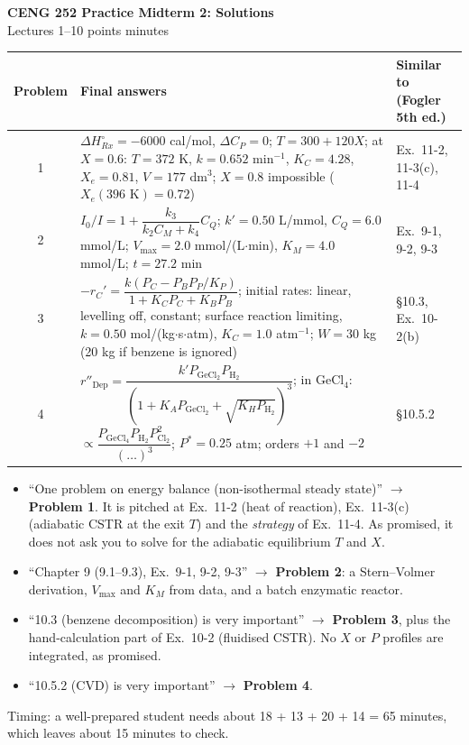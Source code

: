 \documentclass[11pt]{article}
\begin{document}
\begin{center}
{\LARGE\bfseries CENG 252 Practice Midterm 2: Solutions}\\[4pt]
Lectures 1--10 \quad\textbullet{} points \quad\textbullet{} minutes
\end{center}

\begin{center}
\small
\renewcommand{\arraystretch}{1.35}
\begin{tabularx}{\textwidth}{c X l}
\toprule
Problem & Final answers & Similar to (Fogler 5th ed.)\\
\midrule
1 & $\Delta H^\circ_{Rx}=-6000$ cal/mol, $\Delta C_P=0$; $T=300+120X$; at $X=0.6$: $T=372$ K, $k=0.652$ min$^{-1}$,
$K_C=4.28$, $X_e=0.81$, $V=177$ dm$^3$; $X=0.8$ impossible ($X_e(396\text{ K})=0.72$) & Ex.~11-2, 11-3(c), 11-4\\
2 & $I_0/I=1+\dfrac{k_3}{k_2C_M+k_4}C_Q$; $k'=0.50$ L/mmol, $C_Q=6.0$ mmol/L; $V_{\max}=2.0$ mmol/(L$\cdot$min),
$K_M=4.0$ mmol/L; $t=27.2$ min & Ex.~9-1, 9-2, 9-3\\
3 & $-r_C'=\dfrac{k(P_C-P_BP_P/K_P)}{1+K_CP_C+K_BP_B}$; initial rates: linear, levelling off, constant; surface reaction
limiting, $k=0.50$ mol/(kg$\cdot$s$\cdot$atm), $K_C=1.0$ atm$^{-1}$; $W=30$ kg (20 kg if benzene is ignored) & \S10.3, Ex.~10-2(b)\\
4 & $r''_{\text{Dep}}=\dfrac{k'P_{\mathrm{GeCl_2}}P_{\mathrm{H_2}}}{\left(1+K_AP_{\mathrm{GeCl_2}}+\sqrt{K_HP_{\mathrm{H_2}}}\right)^3}$;
in GeCl$_4$: $\propto\dfrac{P_{\mathrm{GeCl_4}}P_{\mathrm{H_2}}P_{\mathrm{Cl_2}}^2}{(\ldots)^3}$; $P^*=0.25$ atm; orders $+1$ and $-2$ & \S10.5.2\\
\bottomrule
\end{tabularx}
\end{center}

\begin{keyidea}
\begin{itemize}[itemsep=1pt]
\item ``One problem on energy balance (non-isothermal steady state)'' $\to$ \textbf{Problem 1}. It is pitched at
Ex.~11-2 (heat of reaction), Ex.~11-3(c) (adiabatic CSTR at the exit $T$) and the \emph{strategy} of Ex.~11-4. As
promised, it does not ask you to solve for the adiabatic equilibrium $T$ and $X$.
\item ``Chapter 9 (9.1--9.3), Ex.~9-1, 9-2, 9-3'' $\to$ \textbf{Problem 2}: a Stern--Volmer derivation, $V_{\max}$ and $K_M$ from data, and a batch enzymatic reactor.
\item ``10.3 (benzene decomposition) is very important'' $\to$ \textbf{Problem 3}, plus the hand-calculation part of
Ex.~10-2 (fluidised CSTR). No $X$ or $P$ profiles are integrated, as promised.
\item ``10.5.2 (CVD) is very important'' $\to$ \textbf{Problem 4}.
\end{itemize}
Timing: a well-prepared student needs about 18 + 13 + 20 + 14 = 65 minutes, which leaves about 15 minutes to check.
\end{keyidea}
\end{document}
